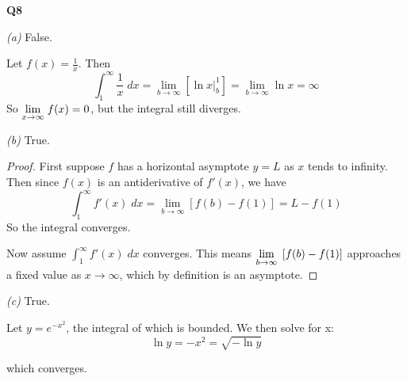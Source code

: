 \documentclass[12pt, a4paper]{article}
\begin{document}
\textbf{Q8}

\textit{(a)} False.

Let $f(x) = \displaystyle\frac{1}{x}$. Then
\[
    \int_1^\infty \frac{1}{x} \;dx =
    \lim_{b \to \infty} \left[\ln x \big\vert_b^1\right] =
    \lim_{b \to \infty} \ln x = \infty
\]
So $\displaystyle{\lim_{x \to \infty}\;}{f(x)} = 0$, but the integral still diverges.

\textit{(b)} True.

\begin{proof}
    First suppose $f$ has a horizontal asymptote $y = L$ as $x$
    tends to infinity. Then since $f(x)$ is an antiderivative of $f'(x)$,
    we have
    \[
        \int_1^\infty f'(x) \;dx = 
        \lim_{b \to \infty} \left[f(b) - f(1)\right] = L - f(1)
    \]
    So the integral converges.

    Now assume $\displaystyle{\int_1^\infty f'(x) \;dx}$ converges.
    This means $\displaystyle{\lim_{b \to \infty}\;}\left[f(b) - f(1)\right]$ approaches
    a fixed value as $x \to \infty$, which by definition is an asymptote.
\end{proof}

\textit{(c)} True.

Let $y = e^{-x^2}$, the integral of which is bounded. We then solve for x:
\[
    \ln y = -x^2 = \sqrt{-\ln y}
\]

which converges.
\end{document}
